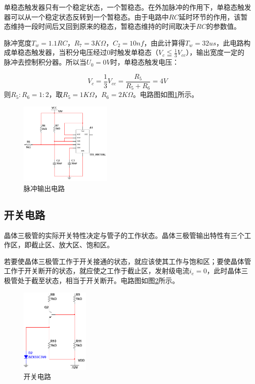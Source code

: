 \documentclass[12pt]{article}
\begin{document}
单稳态触发器只有一个稳定状态，一个暂稳态。在外加脉冲的作用下，单稳态触发器可以从一个稳定状态反转到一个暂稳态。由于电路中$RC$延时环节的作用，该暂态维持一段时间后又回到原来的稳态，暂稳态维持的时间取决于$RC$的参数值。

脉冲宽度$T_w = 1.1RC$，$R_7 = 3K\Omega$，$C_2 = 10nf$，由此计算得$T_w=32us$，此电路构成单稳态触发器，当积分电压经过0时触发单稳态（$V_c \leqq  \frac{1}{3} V_{cc}$），输出宽度一定的脉冲去控制积分器。所以当$U_0 = 0V$时，单稳态触发电压：

\begin{equation}
V_c = \frac{1}{3} V_{cc} = \frac{R_5}{R_5 + R_6} = 4V
\end{equation}
则$R_5:R_6 = 1:2$，取$R_5=1K\Omega$，$R_6 = 2K\Omega$。电路图如图\ref{fig:fig5}所示。

\begin{figure}[htbp]
    \centering
    \includegraphics[width=0.4\textwidth]{fig/fig5.jpg}
    \caption{脉冲输出电路}
    \label{fig:fig5}
\end{figure}

\subsection{开关电路}

晶体三极管的实际开关特性决定与管子的工作状态。晶体三极管输出特性有三个工作区，即截止区、放大区、饱和区。

若要使晶体三极管工作于开关接通的状态，就应该使其工作与饱和区；要使晶体管工作于开关断开的状态，就应使之工作于截止区，发射级电流$i_e = 0$，此时晶体三极管处于截至状态，相当于开关断开。电路图如图\ref{fig:fig6}所示。

\begin{figure}[htbp]
    \centering
    \includegraphics[width=0.3\textwidth]{fig/fig6.jpg}
    \caption{开关电路}
    \label{fig:fig6}
\end{figure}
\end{document}
